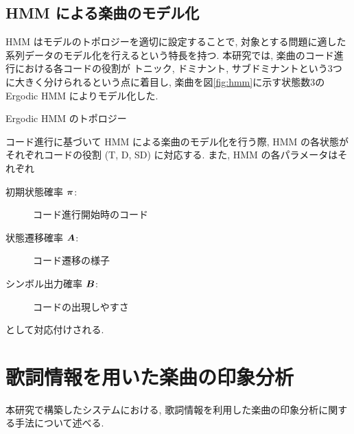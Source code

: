 \documentclass{jpreprint}
\def\vector#1{\mbox{\boldmath{$#1$}}}
\begin{document}
\begin{multicols}{2}
\subsection{HMM による楽曲のモデル化}
HMM はモデルのトポロジーを適切に設定することで,
対象とする問題に適した系列データのモデル化を行えるという特長を持つ.
本研究では,
楽曲のコード進行における各コードの役割が
トニック, ドミナント, サブドミナントという3つに大きく分けられるという点に着目し,
楽曲を図\ref{fig:hmm}に示す状態数3の Ergodic HMM によりモデル化した.

\begin{figurehere}
  \begin{center}
  \caption{Ergodic HMM のトポロジー}
  \label{fig:hmm}
  \end{center}
\end{figurehere}

コード進行に基づいて HMM による楽曲のモデル化を行う際,
HMM の各状態がそれぞれコードの役割 (T, D, SD) に対応する.
また, HMM の各パラメータはそれぞれ
\begin{description}
  \item[初期状態確率 $\vector{\pi}$:] 
    コード進行開始時のコード
  \item[状態遷移確率 $\vector{A}$:]
    コード遷移の様子
  \item[シンボル出力確率 $\vector{B}$:]
    コードの出現しやすさ
\end{description}
として対応付けされる.

\section{歌詞情報を用いた楽曲の印象分析}
本研究で構築したシステムにおける,
歌詞情報を利用した楽曲の印象分析に関する手法について述べる.

\end{multicols}
\end{document}
